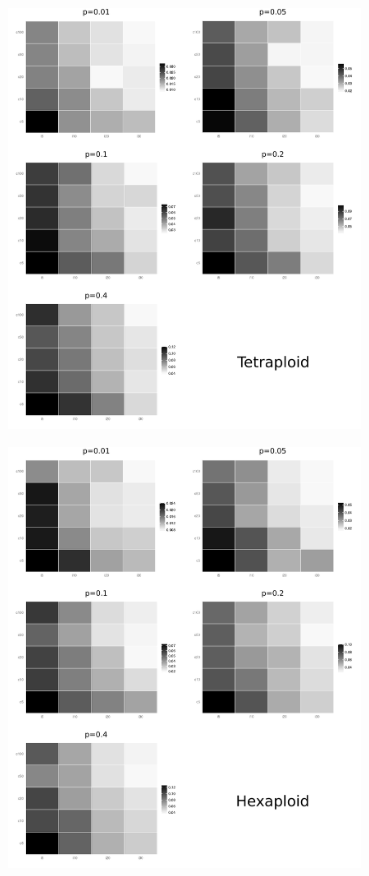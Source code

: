 \documentclass[t,presentation,10pt]{beamer}
\begin{document}
\begin{frame}[c,plain]{}
	\begin{center}
		\includegraphics[width=0.7\textwidth]{fig/figure2-tetra-heatmaps}
	\end{center}
\end{frame}

\begin{frame}[c,plain]{}
	\begin{center}
		\includegraphics[width=0.7\textwidth]{fig/figure3-hex-heatmaps}
	\end{center}
\end{frame}
\end{document}
